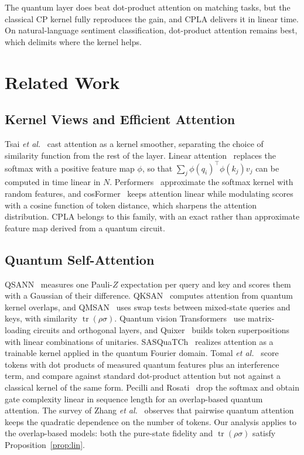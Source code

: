 \documentclass[conference]{IEEEtran}
\newcommand{\cpla}{CPLA}
\begin{document}
The quantum layer does beat dot-product attention on matching tasks, but the classical CP kernel fully reproduces the gain, and \cpla{} delivers it in linear time. On natural-language sentiment classification, dot-product attention remains best, which delimits where the kernel helps.

\section{Related Work}

\subsection{Kernel Views and Efficient Attention}
Tsai \emph{et al.}~\cite{tsai2019dissection} cast attention as a kernel smoother, separating the choice of similarity function from the rest of the layer. Linear attention~\cite{katharopoulos2020linear} replaces the softmax with a positive feature map $\phi$, so that $\sum_j \phi(q_i)^\top\phi(k_j)v_j$ can be computed in time linear in $N$. Performers~\cite{choromanski2021performer} approximate the softmax kernel with random features, and cosFormer~\cite{qin2022cosformer} keeps attention linear while modulating scores with a cosine function of token distance, which sharpens the attention distribution. \cpla{} belongs to this family, with an exact rather than approximate feature map derived from a quantum circuit.

\subsection{Quantum Self-Attention}
QSANN~\cite{li2024qsann} measures one Pauli-$Z$ expectation per query and key and scores them with a Gaussian of their difference. QKSAN~\cite{zhao2024qksan} computes attention from quantum kernel overlaps, and QMSAN~\cite{chen2024qmsan} uses swap tests between mixed-state queries and keys, with similarity $\operatorname{tr}(\rho\sigma)$. Quantum vision Transformers~\cite{cherrat2024qvt} use matrix-loading circuits and orthogonal layers, and Quixer~\cite{khatri2024quixer} builds token superpositions with linear combinations of unitaries. SASQuaTCh~\cite{evans2025sasquatch} realizes attention as a trainable kernel applied in the quantum Fourier domain. Tomal \emph{et al.}~\cite{tomal2025qiattn} score tokens with dot products of measured quantum features plus an interference term, and compare against standard dot-product attention but not against a classical kernel of the same form. Pecilli and Rosati~\cite{pecilli2026overlap} drop the softmax and obtain gate complexity linear in sequence length for an overlap-based quantum attention. The survey of Zhang \emph{et al.}~\cite{zhang2025survey} observes that pairwise quantum attention keeps the quadratic dependence on the number of tokens. Our analysis applies to the overlap-based models: both the pure-state fidelity and $\operatorname{tr}(\rho\sigma)$ satisfy Proposition~\ref{prop:lin}.
\end{document}

